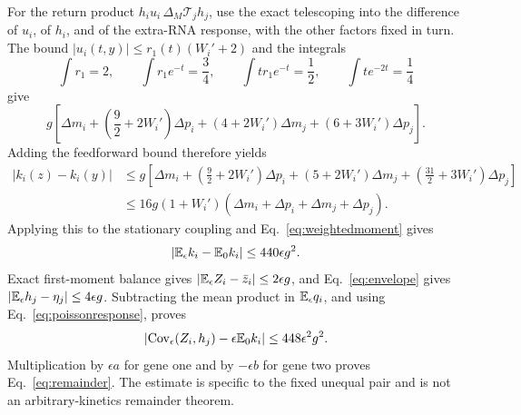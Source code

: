 For the return product $h_i u_i\,\Delta_M\mathcal T_jh_j$,
use the exact telescoping into the difference of $u_i$, of $h_i$,
and of the extra-RNA response, with the other factors fixed in turn.
The bound $|u_i(t,y)|\leq r_1(t)(W_i'+2)$ and the integrals
\begin{equation}
 \int r_1=2,\qquad
 \int r_1e^{-t}=\frac34,\qquad
 \int tr_1e^{-t}=\frac12,\qquad
 \int te^{-2t}=\frac14
\end{equation}
give
\begin{equation}
 g\left[\Delta m_i+
   \left(\frac92+2W_i'\right)\Delta p_i+
   (4+2W_i')\Delta m_j+(6+3W_i')\Delta p_j\right].
\end{equation}
Adding the feedforward bound therefore yields
\begin{align}
 |k_i(z)-k_i(y)|
 &\leq g\left[\Delta m_i+
   \left(\frac92+2W_i'\right)\Delta p_i+
   (5+2W_i')\Delta m_j+
   \left(\frac{31}{2}+3W_i'\right)\Delta p_j\right]\nonumber\\
 &\leq16g(1+W_i')
       (\Delta m_i+\Delta p_i+\Delta m_j+\Delta p_j).
\end{align}
Applying this to the stationary coupling
and Eq.~\eqref{eq:weightedmoment} gives
\begin{equation}
 |\mathbb E_\epsilon k_i-\mathbb E_0k_i|\leq440\epsilon g^2.
\end{equation}
Exact first-moment balance gives
$|\mathbb E_\epsilon Z_i-\bar z_i|\leq2\epsilon g$,
and Eq.~\eqref{eq:envelope} gives
$|\mathbb E_\epsilon h_j-\eta_j|\leq4\epsilon g$.
Subtracting the mean product in $\mathbb E_\epsilon q_i$, and using
Eq.~\eqref{eq:poissonresponse}, proves
\begin{equation}
 \left|\operatorname{Cov}_\epsilon(Z_i,h_j)-\epsilon\mathbb E_0k_i\right|
 \leq448\epsilon^2g^2 .
\end{equation}
Multiplication by $\epsilon a$ for gene one and by $-\epsilon b$
for gene two proves Eq.~\eqref{eq:remainder}. The estimate is
specific to the fixed unequal pair and is not an arbitrary-kinetics
remainder theorem.
